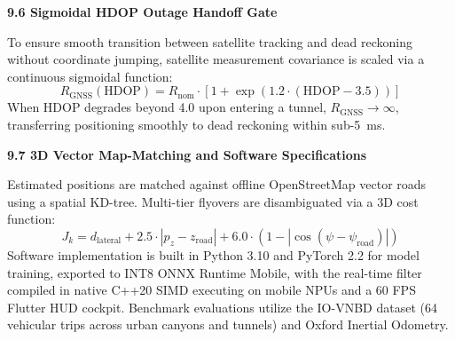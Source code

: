 \documentclass[11pt,a4paper]{article}
\begin{document}
\textbf{9.6 Sigmoidal HDOP Outage Handoff Gate}

To ensure smooth transition between satellite tracking and dead reckoning without coordinate jumping, satellite measurement covariance is scaled via a continuous sigmoidal function:
\begin{equation}
R_{\text{GNSS}}(\text{HDOP}) = R_{\text{nom}} \cdot \left[ 1 + \exp\left( 1.2 \cdot (\text{HDOP} - 3.5) \right) \right]
\end{equation}
When HDOP degrades beyond 4.0 upon entering a tunnel, $R_{\text{GNSS}} \to \infty$, transferring positioning smoothly to dead reckoning within sub-5~ms.

\textbf{9.7 3D Vector Map-Matching and Software Specifications}

Estimated positions are matched against offline OpenStreetMap vector roads using a spatial KD-tree. Multi-tier flyovers are disambiguated via a 3D cost function:
\begin{equation}
J_k = d_{\text{lateral}} + 2.5 \cdot |p_z - z_{\text{road}}| + 6.0 \cdot (1 - |\cos(\psi - \psi_{\text{road}})|)
\end{equation}
Software implementation is built in Python 3.10 and PyTorch 2.2 for model training, exported to INT8 ONNX Runtime Mobile, with the real-time filter compiled in native C++20 SIMD executing on mobile NPUs and a 60 FPS Flutter HUD cockpit. Benchmark evaluations utilize the IO-VNBD dataset (64 vehicular trips across urban canyons and tunnels) and Oxford Inertial Odometry.
\newpage
\end{document}
